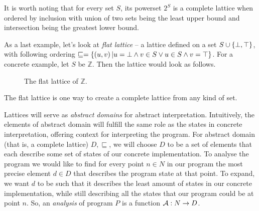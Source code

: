 \documentclass[..thesis.tex]{subfiles}
\begin{document}
It is worth noting that for every set $S$, its powerset $2^S$ is a complete lattice when ordered by inclusion with union of two sets being the least upper bound and
intersection being the greatest lower bound.

As a last example, let's look at \textit{flat lattice} -- a lattice defined on a set $S \cup \left\lbrace \bot, \top \right\rbrace$, 
with following ordering $\sqsubseteq = \left\lbrace \left(  u,v \right)  | u = \bot \land v \in S \lor  u \in S \land  v = \top \right\rbrace$.
For a concrete example, let $S$ be $\mathbb{Z}$. Then the lattice would look as follows.

\begin{figure}[H]
  \begin{center}
  \end{center}
  \caption{The flat lattice of $\mathbb{Z}$.}
\end{figure}

The flat lattice is one way to create a complete lattice from any kind of set.


Lattices will serve as \textit{abstract domains} for abstract interpretation.
Intuitively, the elements of abstract domain will fulfill the same role as the states in concrete interpretation, offering context for interpreting the program.
For abstract domain (that is, a complete lattice) $D,\sqsubseteq$,
we will choose $D$ to be a set of elements that each describe some set of states of our concrete implementation.
To analyse the program we would like to find for every point $n \in N$ in our program the most precise element $d \in D$ that describes the program state at that point.
To expand, we want $d$ to be such that it describes the least amount of states in our concrete implementation,
while still describing all the states that our program could be at point $n$. So, an \textit{analysis} of program $P$ is a function $\mathcal{A} : N \to D$.
\end{document}
